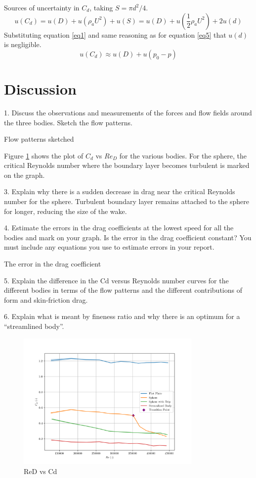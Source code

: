 \documentclass[8pt]{article}
\begin{document}
Sources of uncertainty in $C_d$, taking $S=\pi d^2/4$.
\begin{equation}
    u(C_d) = u(D) + u(\rho_a U^2) + u(S) = u(D) + u(\frac{1}{2}\rho_a U^2) + 2u(d)
\end{equation}
Substituting equation \ref{eq1} and same reasoning as for equation \ref{eq5} that $u(d)$ is negligible.
\begin{equation}
    u(C_d) \approx u(D) + u(p_0-p)
\end{equation}


\section{Discussion}


1. Discuss the observations and measurements of the forces and flow fields around the three
bodies. Sketch the flow patterns.

Flow patterns sketched

Figure \ref{fig:figure1} shows the plot of $C_d$ vs $Re_D$ for the various bodies. 
For the sphere, the critical Reynolds number where the boundary layer becomes turbulent is marked on the graph.

3. Explain why there is a sudden decrease in drag near the critical Reynolds number for the
sphere.
Turbulent boundary layer remains attached to the sphere for longer, reducing the size of the wake.

4. Estimate the errors in the drag coefficients at the lowest speed for all the bodies and
mark on your graph. Is the error in the drag coefficient constant? You must include any
equations you use to estimate errors in your report.

The error in the drag coefficient 

5. Explain the difference in the Cd versus Reynolds number curves for the different bodies in
terms of the flow patterns and the different contributions of form and skin-friction drag.

6. Explain what is meant by fineness ratio and why there is an optimum for a “streamlined
body”.


\begin{figure}[H]
    \centering
    \includegraphics[width=0.8\textwidth]{Re_vs_Cd.png}
    \caption{ReD vs Cd}
    \label{fig:figure1}
\end{figure}
\end{document}
